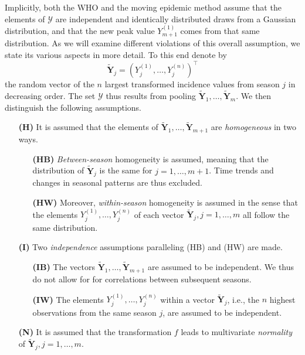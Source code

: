 \documentclass[12pt]{article}
\begin{document}
Implicitly, both the WHO and the moving epidemic method assume that the elements of $\mathcal{Y}$ are independent and identically distributed draws from a Gaussian distribution, and that the new peak value $Y_{m + 1}^{(1)}$ comes from that same distribution. As we will examine different violations of this overall assumption, we state its various aspects in more detail. To this end denote by
\begin{equation}
\tilde{\mathbf{Y}}_j = (Y^{(1)}_j, \dots, Y^{(n)}_j)^\top\label{eq:Y_tilde}
\end{equation}
the random vector of the $n$ largest transformed incidence values from season $j$ in decreasing order. The set $\mathcal{Y}$ thus results from pooling $\tilde{\mathbf{Y}}_1, \dots, \tilde{\mathbf{Y}}_m$. We then distinguish the following assumptions.
\begin{itemize}
\item[\textbf{(H)}] It is assumed that the elements of $\tilde{\mathbf{Y}}_1, \dots, \tilde{\mathbf{Y}}_{m + 1}$ are \textit{homogeneous} in two ways.
\begin{itemize}
\item[\textbf{(HB)}] \textit{Between-season} homogeneity is assumed, meaning that the distribution of $\tilde{\mathbf{Y}}_j$ is the same for $j = 1, \dots, m + 1$. Time trends and changes in seasonal patterns are thus excluded.
\item[\textbf{(HW)}] Moreover, \textit{within-season} homogeneity is assumed in the sense that the elements $Y_j^{(1)}, \dots, Y_j^{(n)}$ of each vector $\tilde{\mathbf{Y}}_j, j = 1, \dots, m$ all follow the same distribution.
\end{itemize}
\item[\textbf{(I)}] Two \textit{independence} assumptions paralleling (HB) and (HW) are made.
\begin{itemize}
\item[\textbf{(IB)}] The vectors $\tilde{\mathbf{Y}}_1, \dots, \tilde{\mathbf{Y}}_{m + 1}$ are assumed to be independent. We thus do not allow for for correlations between subsequent seasons.
\item[\textbf{(IW)}] The elements $Y_j^{(1)}, \dots, Y_j^{(n)}$ within a vector $\tilde{\mathbf{Y}}_j$, i.e., the $n$ highest observations from the same season $j$, are assumed to be independent.
\end{itemize}
\item[\textbf{(N)}] It is assumed that the transformation $f$ leads to multivariate \textit{normality} of $\tilde{\mathbf{Y}}_j, j = 1, \dots, m$.
\end{itemize}
\end{document}
